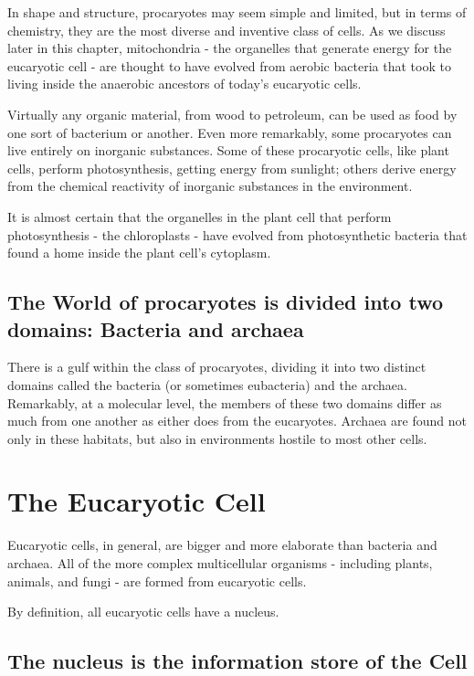 In shape and structure, procaryotes may seem simple and limited,
but in terms of chemistry, they are the most diverse and inventive class
of cells.
As we discuss later in this chapter, mitochondria - the organelles that 
generate energy for the eucaryotic cell - are thought to have evolved from 
aerobic bacteria that took to living inside the anaerobic ancestors of 
today’s eucaryotic cells.

Virtually any organic material, from wood to petroleum, can be used as
food by one sort of bacterium or another. Even more remarkably, some
procaryotes can live entirely on inorganic substances.
Some of these procaryotic cells, like plant cells, perform photosynthesis, 
getting energy from sunlight; others derive energy from the chemical 
reactivity of inorganic substances in the environment.

It is almost certain that the organelles in the plant cell that
perform photosynthesis - the chloroplasts - have evolved from photosynthetic 
bacteria that found a home inside the plant cell’s cytoplasm.

\subsection{The World of procaryotes is divided into two domains: Bacteria and archaea}

There is a gulf within the class of procaryotes, dividing it into two distinct 
domains called the bacteria (or sometimes eubacteria) and the archaea. 
Remarkably, at a molecular level, the members of these two domains differ as 
much from one another as either does from the eucaryotes.
Archaea are found not only in these habitats, but also
in environments hostile to most other cells.

\section{The Eucaryotic Cell}

Eucaryotic cells, in general, are bigger and more elaborate than bacteria
and archaea. All of the more complex multicellular organisms - including
plants, animals, and fungi - are formed from eucaryotic cells.

By definition, all eucaryotic cells have a nucleus.

\subsection{The nucleus is the information store of the Cell}

